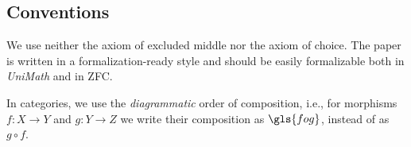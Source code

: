 \documentclass[onecolumn,12pt]{amsart}
\numberwithin{proposition}{subsection}
\newcommand{\sr}{\rightarrow}
\newcommand{\nn}{{\mathbb N}}
\newcommand{\nat}{\nn}
\newcommand{\wt}{\widetilde}
\newcommand{\RR}{{\bf RR}}
\newcommand{\LM}{{\bf LM}}
\begin{document}




\subsection{Conventions}

We use neither the axiom of excluded middle nor the axiom of choice. The paper
is written in a formalization-ready style and should be easily formalizable
both in {\em UniMath} and in ZFC.

In categories, we use the {\em diagrammatic} order of composition, i.e., for morphisms $f:X\sr Y$
and $g:Y\sr Z$ we write their composition as $\gls{fog}$, instead of as $g \circ f$.
\end{document}
